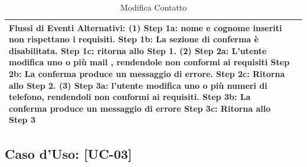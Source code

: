 \documentclass[a4paper,12pt]{article}
\begin{document}
\begin{table}[htbp]
\begin{tabularx}{\textwidth}{|p{}|X|}
{                \textbf{Flussi di Eventi Alternativi:} \newline \textbf{(1)} \newline Step 1a: nome e cognome inseriti non rispettano i requisiti. \newline Step 1b: La sezione di conferma è disabilitata. \newline Step 1c: ritorna allo Step 1. \newline \textbf{(2)} \newline Step 2a: L'utente modifica uno o più mail , rendendole non conformi ai requisiti \newline Step 2b: La conferma produce un messaggio di errore. \newline Step 2c: Ritorna allo Step 2. \newline \textbf{(3)} \newline Step 3a: l'utente modifica uno o più numeri di telefono, rendendoli non conformi ai requisiti. \newline Step 3b: La conferma produce un messaggio di errore \newline Step 3c: Ritorna allo Step 3
            } \\
            \hline
        \end{tabularx}
        \caption{Modifica Contatto}
    \end{table}
    \newpage
    \subsection{Caso d'Uso: [UC-03]}
\end{document}
